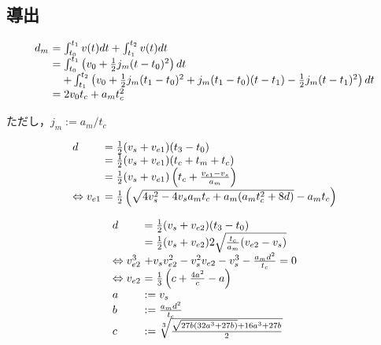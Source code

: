 \documentclass[a5paper]{ltjsarticle}
\begin{document}
\subsection{導出}

$$
    \begin{array}{l@{~}l}
        d_m & =                  \int_{t_0}^{t_1}v(t) dt + \int_{t_1}^{t_2}v(t) dt
        \\
            & =                  \int_{t_0}^{t_1}\left( v_0+\frac{1}{2} j_m(t-t_0)^2 \right) dt
        \\
            & \quad+ \int_{t_1}^{t_2}\left(
        v_0+                     \frac{1}{2} j_m(t_1-t_0)^2
        +j_m(t_1-t_0)(t-t_1) -   \frac{1}{2}j_m(t-t_1)^2
        \right) dt
        \\
            & = 2v_0t_c+a_mt_c^2
    \end{array}
$$

ただし，$j_m:=a_m/t_c$

$$
    \begin{array}{l@{~}l}
        d                      & = \frac{1}{2}(v_s+v_{e1})(t_3-t_0)
        \\
                               & = \frac{1}{2}(v_s+v_{e1})(t_c+t_m+t_c)
        \\
                               & = \frac{1}{2}(v_s+v_{e1})\left(t_c+\frac{v_{e1}-v_s}{a_m}\right)
        \\
        \Leftrightarrow v_{e1} & =
        \frac{1}{2}\left(\sqrt{4v_s^2-4v_sa_mt_c+a_m(a_mt_c^2+8d)}-a_mt_c\right)
    \end{array}
$$

$$
    \begin{array}{l@{~}l}
        d        & =                                                         \frac{1}{2}(v_s+v_{e2})(t_3-t_0)
        \\
                 & =                                                         \frac{1}{2}(v_s+v_{e2})2\sqrt{\frac{t_c}{a_m}(v_{e2}-v_s)}
        \\
        \Leftrightarrow
        v_{e2}^3 & + v_s v_{e2}^2-v_s^2v_{e2}-v_s^3-\frac{a_md^2}{t_c} = 0
        \\
        \Leftrightarrow
        v_{e2}   & =
        \frac{1}{3}\left(c +\frac{4a^2}{c}
        -a
        \right)
        \\
        a        & := v_s
        \\
        b        & :=                                                        \frac{a_md^2}{t_c}
        \\
        c        & :=                                                        \sqrt[3]{\frac{\sqrt{27b(32a^3+27b)} + 16a^3+27b}{2}}
    \end{array}
$$
\end{document}
